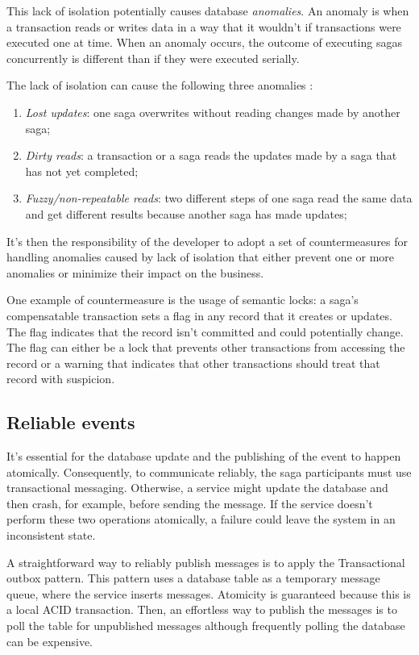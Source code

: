 \documentclass[conference]{IEEEtran}
\begin{document}
This lack of isolation potentially causes database \textit{anomalies}. An anomaly is when a transaction reads or writes data in a way that it wouldn’t if transactions were executed one at time. When an anomaly occurs, the outcome of executing sagas concurrently is different than if they were executed serially.

The lack of isolation can cause the following three anomalies \cite{microservices-patterns-anomalies}:

\begin{enumerate}
  \item \textit{Lost updates}: one saga overwrites without reading changes made by another saga;
  \item \textit{Dirty reads}: a transaction or a saga reads the updates made by a saga that has not yet completed;
  \item \textit{Fuzzy/non-repeatable reads}: two different steps of one saga read the same data and get different results because another saga has made updates;
\end{enumerate}

It’s then the responsibility of the developer to adopt a set of countermeasures for handling anomalies caused by lack of isolation that either prevent one or more anomalies or minimize their impact on the business. \cite{semantic-acid}

One example of countermeasure is the usage of semantic locks: a saga’s compensatable transaction sets a flag in any record that it creates or updates. The flag indicates that the record isn’t committed and could potentially change. The flag can either be a lock that prevents other transactions from accessing the record or a warning that indicates that other transactions should treat that record with suspicion.

\subsection{Reliable events}

It’s essential for the database update and the publishing of the event to happen atomically. Consequently, to communicate reliably, the saga participants must use transactional messaging. Otherwise, a service might update the database and then crash, for example, before sending the message. If the service doesn’t perform these two operations atomically, a failure could leave the system in an inconsistent state.

A straightforward way to reliably publish messages is to apply the Transactional outbox pattern. This pattern uses a database table as a temporary message queue, where the service inserts messages. Atomicity is guaranteed because this is a local ACID transaction. Then, an effortless way to publish the messages is to poll the table for unpublished messages although frequently polling the database can be expensive.
\end{document}
